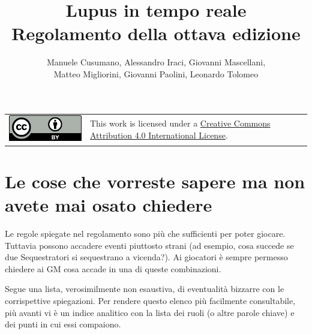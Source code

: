 \documentclass[a4paper,10pt]{article}
\title{Lupus in tempo reale\\ Regolamento della ottava edizione}
\author{Manuele Cusumano, Alessandro Iraci, Giovanni Mascellani,\\ Matteo Migliorini, Giovanni Paolini, Leonardo Tolomeo}
\begin{document}
	
\maketitle

\begin{tabular}{lp{}}
	\begin{minipage}{0.22\textwidth}
		\vspace{3mm}
		\href{http://creativecommons.org/licenses/by/4.0/}{\includegraphics{ccby.pdf}}
	\end{minipage}
	&
	This work is licensed under a \href{http://creativecommons.org/licenses/by/4.0/}{Creative Commons Attribution 4.0 International License}.
\end{tabular}

\section*{Le cose che vorreste sapere ma non avete mai osato chiedere}
\label{faq}

Le regole spiegate nel regolamento sono più che sufficienti per poter giocare. Tuttavia possono accadere eventi piuttosto strani (ad esempio, cosa succede se due Sequestratori si sequestrano a vicenda?). Ai giocatori è sempre permesso chiedere ai GM cosa accade in una di queste combinazioni.

Segue una lista, verosimilmente non esaustiva, di eventualità bizzarre con le corrispettive spiegazioni.
Per rendere questo elenco più facilmente consultabile, più avanti vi è un indice analitico con la lista dei ruoli (o altre parole chiave) e dei punti in cui essi compaiono.
\end{document}
